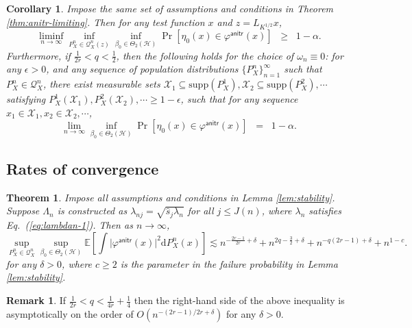 \documentclass[aos]{imsart}
\renewcommand{\hat}{\widehat}
\newcommand{\supp}{\mathrm{supp}}
\newcommand{\mX}{\mathcal X}
\newcommand{\ud}{\mathrm d}
\newcommand{\mH}{\mathcal H}
\newcommand{\anitr}{\mathsf{anitr}}
\theoremstyle{plain}
\newtheorem{theorem}{Theorem}[section]
\newtheorem{corollary}{Corollary}[section]
\theoremstyle{definition}
\theoremstyle{definition}
\newtheorem{remark}{Remark}[section]
\begin{document}
\begin{corollary}
Impose the same set of assumptions and conditions in Theorem \ref{thm:anitr-limiting}. Then for any test function $x$ and $z=L_{K^{1/2}}x$,
$$
\liminf_{n\to\infty}\inf_{P_X^n\in\mathcal Q_X^n(z)}\inf_{\beta_0\in\Theta_2(\mH)}\Pr[\eta_0(x)\in\varphi^\anitr(x)] \;\;\geq\;\; 1-\alpha.
$$
Furthermore, if $\frac{1}{2r}<q<\frac{1}{2}$, then the following holds for the choice of $\omega_n\equiv 0$:
for any $\epsilon>0$, and any sequence of population distributions $\{P_X^n\}_{n=1}^{\infty}$ such that $P_X^n\in\mathcal Q_X^n$, there exist measurable sets $\mX_1\subseteq\supp(P_X^1),\mX_2\subseteq\supp(P_X^2),\cdots$ satisfying $P_X^1(\mX_1),P_X^2(\mX_2),\cdots\geq 1-\epsilon$,
such that for any sequence $x_1\in\mX_1,x_2\in\mX_2,\cdots$, 
$$
\lim_{n\to\infty}\inf_{\beta_0\in\Theta_2(\mH)} \Pr[\eta_0(x)\in\varphi^\anitr(x)] \;\; = \;\; 1-\alpha.
$$
\label{cor:anitr}
\end{corollary}

\subsection{Rates of convergence}

\begin{theorem}
Impose all assumptions and conditions in Lemma \ref{lem:stability}. Suppose $\Lambda_n$ is constructed as $\lambda_{nj}=\sqrt{\hat s_j\lambda_n}$ for all $j\leq J(n)$,
where $\lambda_n$ satisfies Eq.~(\ref{eq:lambdan-1}). Then as $n\to\infty$, 
$$
\sup_{P_X^n\in\mathcal Q_X^n}\sup_{\beta_0\in\Theta_2(\mH)}\mathbb E\left[\int \big|\varphi^\anitr(x)\big|^2\ud P_X^n(x) \right] \lesssim n^{-\frac{2r-1}{2r}+\delta} + n^{2q-\frac{3}{2}+\delta} + n^{-q(2r-1)+\delta} + n^{1-c}.
$$
for any $\delta>0$, where $c\geq 2$ is the parameter in the failure probability in Lemma \ref{lem:stability}.
\label{thm:anitr-rates}
\end{theorem}

\begin{remark}
If $\frac{1}{2r}<q<\frac{1}{4r}+\frac{1}{4}$ then the right-hand side of the above inequality is asymptotically on the order of $O(n^{-(2r-1)/2r+\delta})$ for any $\delta>0$.
\end{remark}


\end{document}
